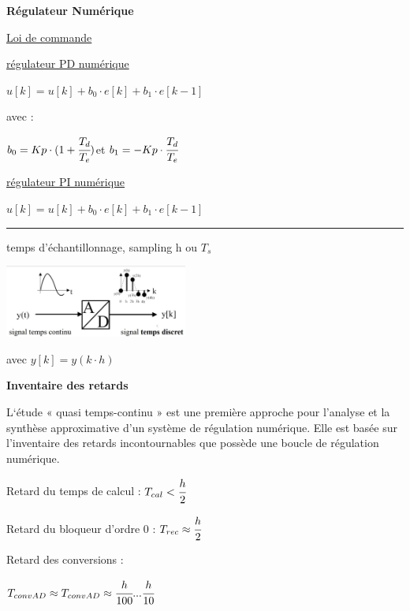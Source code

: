 \documentclass[	DIV=calc,%
							paper=a4,%
							fontsize=11pt,%
							twocolumn]{scrartcl} %
\newcommand{\hformbar}[1]{\bigskip\hrule\vspace{5pt}} %
\newcounter{mycounter}
\newcommand{\formdesc}[1]{\noindent\textbf{#1} \addtocounter{mycounter}{1} \hfill \themycounter}
\newcommand{\formtitle}[1]{\noindent\underline{#1}}
\begin{document}
\formdesc{Régulateur Numérique}

\formtitle{Loi de commande }

\underline{régulateur PD numérique}
\vspace{3mm}

$u[k] = u[k] + b_0 \cdot e[k]+ b_1 \cdot e[k-1]$ 

avec :


\hfill $b_0 = Kp\cdot(1+\cfrac{T_d}{T_e})$\hfill et \hfill $b_1 = -Kp \cdot \cfrac{T_d}{T_e}$ \hfill

\vspace{3mm}

\underline{régulateur PI numérique}
\vspace{3mm}

$u[k] = u[k] + b_0 \cdot e[k]+ b_1 \cdot e[k-1]$ 

\hformbar


\formdesc{Échantillonnage}

temps d'échantillonnage, sampling h ou $T_s$ 

\includegraphics[width = 0.45\textwidth]{img/echantillonage.JPG}
\begin{center}
    avec $y[k] = y(k \cdot h)$
\end{center}



\formdesc{Inventaire des retards}

L‘étude « quasi temps-continu » est une première approche pour 
l’analyse et la synthèse approximative d’un système de régulation 
numérique.
Elle est basée sur l’inventaire des retards incontournables que 
possède une boucle de régulation numérique.

Retard du temps de calcul : $T_{cal} < \cfrac{h}{2}$

Retard du bloqueur d'ordre 0 : $T_{rec} \approx \cfrac{h}{2}$

\vspace{3mm}

Retard des conversions :

$T_{convAD} \approx T_{convAD} \approx \cfrac{h}{100} ... \cfrac{h}{10} $


\vspace{2mm}


\vspace{0.5cm}

\end{document}
